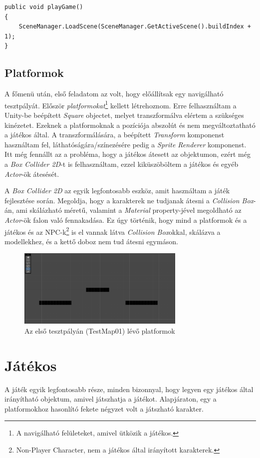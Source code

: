 \documentclass[]{thesis-ekf}
\theoremstyle{definition}
\begin{document}
	\begin{lstlisting}[breaklines=true, caption={A játék Scene léptető kódsora.}, captionpos=b]
public void playGame()
{	
	SceneManager.LoadScene(SceneManager.GetActiveScene().buildIndex + 1);
}
	\end{lstlisting}

	\subsection{Platformok}
	A főmenü után, első feladatom az volt, hogy előállítsak egy navigálható tesztpályát. Először \emph{platformokat}\footnote{A navigálható felületeket, amivel ütközik a játékos.} kellett létrehoznom. Erre felhasználtam a Unity-be beépített \emph{Square} objectet, melyet transzformálva elértem a szükséges kinézetet. Ezeknek a platformoknak a pozíciója abszolút és nem megváltoztatható a játékos által. A transzformálására, a beépített \emph{Transform} komponenst használtam fel, láthatóságára/színezésére pedig a \emph{Sprite Renderer} komponenst. Itt még fennállt az a probléma, hogy a játékos átesett az objektumon, ezért még a \emph{Box Collider 2D}-t is felhasználtam, ezzel kiküszöböltem a játékos és egyéb \emph{Actor}-ök átesését.
	
	A \emph{Box Collider 2D} az egyik legfontosabb eszköz, amit használtam a játék fejlesztése során. Megoldja, hogy a karakterek ne tudjanak átesni a \emph{Collision Box}-án, ami skálázható méretű, valamint a \emph{Material} property-jével megoldható az \emph{Actor}-ök falon való fennakadása. Ez úgy történik, hogy mind a platformok és a játékos és az NPC-k\footnote{Non-Player Character, nem a játékos által irányított karakterek.} is el vannak látva \emph{Collision Box}okkal, skálázva a modellekhez, és a kettő doboz nem tud átesni egymáson.
	
	
	\begin{figure}[!ht]
		\label{kep:platform}
		\centering
		\includegraphics[width=8cm]{platforms}
		\caption{Az első tesztpályán (TestMap01) lévő platformok}
	\end{figure}

	\section{Játékos}
	A játék egyik legfontosabb része, minden bizonnyal, hogy legyen egy játékos által irányítható objektum, amivel játszhatja a játékot. Alapjáraton, egy a platformokhoz hasonlító fekete négyzet volt a játszható karakter.
\end{document}
